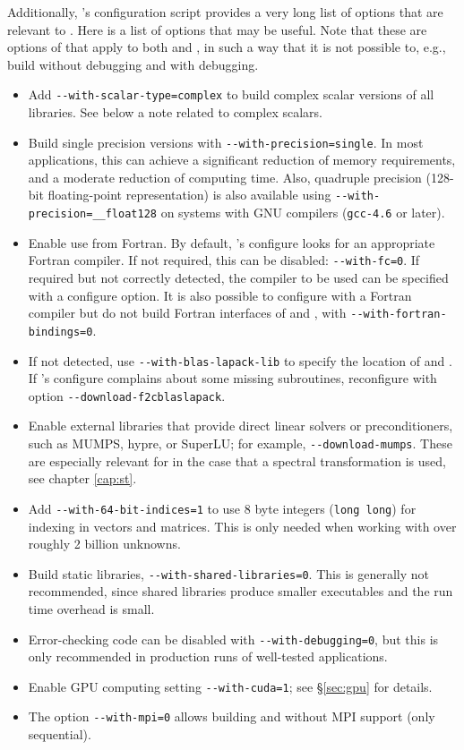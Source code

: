 Additionally, \petsc's configuration script provides a very long list of options that are relevant to \slepc. Here is a list of options that may be useful. Note that these are options of \petsc that apply to both \petsc and \slepc, in such a way that it is not possible to, e.g., build \petsc without debugging and \slepc with debugging.
\begin{itemize}
\item Add \Verb!--with-scalar-type=complex! to build complex scalar versions of all libraries. See below a note related to complex scalars.
\item Build single precision versions with \Verb!--with-precision=single!. In most applications, this can achieve a significant reduction of memory requirements, and a moderate reduction of computing time. Also, quadruple precision (128-bit floating-point representation) is also available using \Verb!--with-precision=__float128! on systems with GNU compilers (\texttt{gcc-4.6} or later).
\item Enable use from Fortran. By default, \petsc's configure looks for an appropriate Fortran compiler. If not required, this can be disabled: \Verb!--with-fc=0!. If required but not correctly detected, the compiler to be used can be specified with a configure option. It is also possible to configure with a Fortran compiler but do not build Fortran interfaces of \petsc and \slepc, with \Verb!--with-fortran-bindings=0!.
\item If not detected, use \Verb!--with-blas-lapack-lib! to specify the location of \blas and \lapack. If \slepc's configure complains about some missing \lapack subroutines, reconfigure \petsc with option \Verb!--download-f2cblaslapack!.
\item Enable external libraries that provide direct linear solvers or preconditioners, such as MUMPS, hypre, or SuperLU; for example, \Verb!--download-mumps!. These are especially relevant for \slepc in the case that a spectral transformation is used, see chapter \ref{cap:st}.
\item Add \Verb!--with-64-bit-indices=1! to use 8 byte integers (\texttt{long long}) for indexing in vectors and matrices. This is only needed when working with over roughly 2 billion unknowns.
\item Build static libraries, \Verb!--with-shared-libraries=0!. This is generally not recommended, since shared libraries produce smaller executables and the run time overhead is small.
\item Error-checking code can be disabled with \Verb!--with-debugging=0!, but this is only recommended in production runs of well-tested applications.
\item Enable GPU computing setting \Verb!--with-cuda=1!; see \S\ref{sec:gpu} for details.
\item The option \Verb!--with-mpi=0! allows building \petsc and \slepc without MPI support (only sequential).
\end{itemize}

